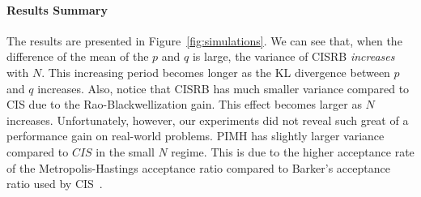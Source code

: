\paragraph{Results Summary}
The results are presented in Figure~\ref{fig:simulations}.
We can see that, when the difference of the mean of the \(p\) and \(q\) is large, the variance of CISRB \textit{increases} with \(N\).
This increasing period becomes longer as the KL divergence between \(p\) and \(q\) increases.
Also, notice that CISRB has much smaller variance compared to CIS due to the Rao-Blackwellization gain.
This effect becomes larger as \(N\) increases.
Unfortunately, however, our experiments did not reveal such great of a performance gain on real-world problems.
PIMH has slightly larger variance compared to \(CIS\) in the small \(N\) regime.
This is due to the higher acceptance rate of the Metropolis-Hastings acceptance ratio compared to Barker's acceptance ratio used by CIS~\citep{peskun_optimum_1973, minh_understanding_2015}.
